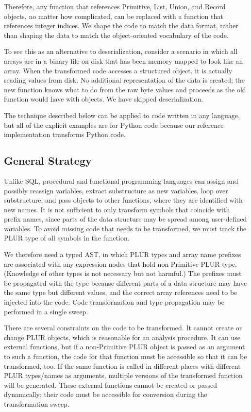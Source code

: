 \documentclass[10pt, conference, compsocconf]{IEEEtran}
\begin{document}
Therefore, any function that references Primitive, List, Union, and Record objects, no matter how complicated, can be replaced with a function that references integer indices. We shape the code to match the data format, rather than shaping the data to match the object-oriented vocabulary of the code.

To see this as an alternative to deserialization, consider a scenario in which all arrays are in a binary file on disk that has been memory-mapped to look like an array. When the transformed code accesses a structured object, it is actually reading values from disk. No additional representation of the data is created; the new function knows what to do from the raw byte values and proceeds as the old function would have with objects. We have skipped deserialization.

The technique described below can be applied to code written in any language, but all of the explicit examples are for Python code because our reference implementation\cite{plur} transforms Python code.

\subsection{General Strategy}

Unlike SQL, procedural and functional programming languages can assign and possibly reassign variables, extract substructure as new variables, loop over substructure, and pass objects to other functions, where they are identified with new names. It is not sufficient to only transform symbols that coincide with prefix names, since parts of the data structure may be spread among user-defined variables. To avoid missing code that needs to be transformed, we must track the PLUR type of all symbols in the function.

We therefore need a typed AST, in which PLUR types and array name prefixes are associated with any expression nodes that hold non-Primitive PLUR type. (Knowledge of other types is not necessary but not harmful.) The prefixes must be propagated with the type because different parts of a data structure may have the same type but different values, and the correct array references need to be injected into the code. Code transformation and type propagation may be performed in a single sweep.

There are several constraints on the code to be transformed. It cannot create or change PLUR objects, which is reasonable for an analysis procedure. It can use external functions, but if a non-Primitive PLUR object is passed as an argument to such a function, the code for that function must be accessible so that it can be transformed, too. If the same function is called in different places with different PLUR types/names as arguments, multiple versions of the transformed function will be generated. These external functions cannot be created or passed dynamically; their code must be accessible for conversion during the transformation sweep.
\end{document}
